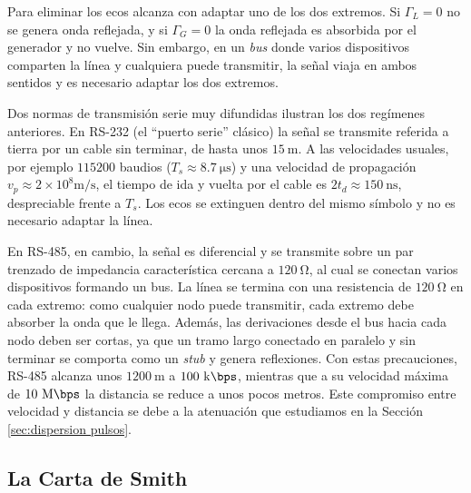 Para eliminar los ecos alcanza con adaptar uno de los dos extremos. Si $\Gamma_L=0$ no se genera onda reflejada, y si $\Gamma_G=0$ la onda reflejada es absorbida por el generador y no vuelve. Sin embargo, en un \emph{bus} donde varios dispositivos comparten la línea y cualquiera puede transmitir, la señal viaja en ambos sentidos y es necesario adaptar los dos extremos.

\begin{ejemplo}[RS-232 y RS-485]\label{ejemplo:rs485}
Dos normas de transmisión serie muy difundidas ilustran los dos regímenes anteriores. En RS-232 (el ``puerto serie'' clásico) la señal se transmite referida a tierra por un cable sin terminar, de hasta unos $15\ \unit{\meter}$. A las velocidades usuales, por ejemplo $115200$ baudios ($T_s\approx 8.7\ \unit{\micro\second}$) y una velocidad de propagación $v_p\approx 2\times 10^8 \unit{\meter/\second}$, el tiempo de ida y vuelta por el cable es $2t_d\approx 150\ \unit{\nano\second}$, despreciable frente a $T_s$. Los ecos se extinguen dentro del mismo símbolo y no es necesario adaptar la línea.

En RS-485, en cambio, la señal es diferencial y se transmite sobre un par trenzado de impedancia característica cercana a $120\ \unit{\ohm}$, al cual se conectan varios dispositivos formando un bus. La línea se termina con una resistencia de $120\ \unit{\ohm}$ en cada extremo: como cualquier nodo puede transmitir, cada extremo debe absorber la onda que le llega. Además, las derivaciones desde el bus hacia cada nodo deben ser cortas, ya que un tramo largo conectado en paralelo y sin terminar se comporta como un \emph{stub} y genera reflexiones. Con estas precauciones, RS-485 alcanza unos $1200\ \unit{\meter}$ a $100\ \unit{\kilo\bps}$, mientras que a su velocidad máxima de $10\ \unit{\mega\bps}$ la distancia se reduce a unos pocos metros. Este compromiso entre velocidad y distancia se debe a la atenuación que estudiamos en la Sección \ref{sec:dispersion pulsos}.
\end{ejemplo}

\subsection*{La Carta de Smith}

